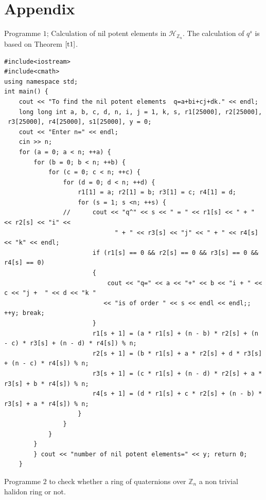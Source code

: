 \documentclass[sn-mathphys,Numbered]{sn-jnl}%
\theoremstyle{thmstyleone}
\theoremstyle{thmstyletwo}
\theoremstyle{thmstylethree}
\begin{document}
\section{Appendix}
Programme $1$; Calculation of nil potent elements in $\mathcal{H}_{\mathbb{Z}_{n}}$. The calculation of $q^{s}$ is based on Theorem $\ref{t1}$. 
\begin{verbatim}
#include<iostream>
#include<cmath>
using namespace std;
int main() {
	cout << "To find the nil potent elements  q=a+bi+cj+dk." << endl;
	long long int a, b, c, d, n, i, j = 1, k, s, r1[25000], r2[25000],
 r3[25000], r4[25000], s1[25000], y = 0;
	cout << "Enter n=" << endl;
	cin >> n;
	for (a = 0; a < n; ++a) {
		for (b = 0; b < n; ++b) {
			for (c = 0; c < n; ++c) {
				for (d = 0; d < n; ++d) {
					r1[1] = a; r2[1] = b; r3[1] = c; r4[1] = d;
					for (s = 1; s <n; ++s) {
				//		cout << "q^" << s << " = " << r1[s] << " + " << r2[s] << "i" <<
                              " + " << r3[s] << "j" << " + " << r4[s] << "k" << endl;
						if (r1[s] == 0 && r2[s] == 0 && r3[s] == 0 && r4[s] == 0)
						{
							cout << "q=" << a << "+" << b << "i + " << c << "j +  " << d << "k " 
                           << "is of order " << s << endl << endl;; ++y; break;
						}
						r1[s + 1] = (a * r1[s] + (n - b) * r2[s] + (n - c) * r3[s] + (n - d) * r4[s]) % n;
						r2[s + 1] = (b * r1[s] + a * r2[s] + d * r3[s] + (n - c) * r4[s]) % n;
						r3[s + 1] = (c * r1[s] + (n - d) * r2[s] + a * r3[s] + b * r4[s]) % n;
						r4[s + 1] = (d * r1[s] + c * r2[s] + (n - b) * r3[s] + a * r4[s]) % n;
					}
				}
			}
		} 
		} cout << "number of nil potent elements=" << y; return 0;
	}
\end{verbatim}
Programme $2$  to check whether a ring of quaternions over $\mathbb{Z}_{n}$ a non trivial halidon ring or not. 
\end{document}
